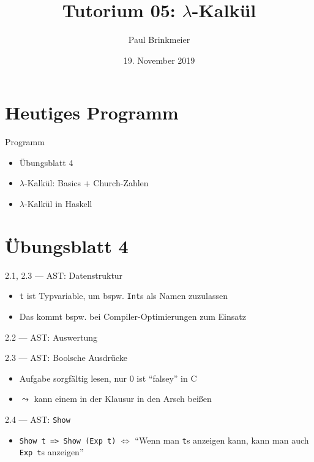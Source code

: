 \documentclass{beamer}
\title{Tutorium 05: $\lambda$-Kalkül}
\author{Paul Brinkmeier}
\institute{Tutorium Programmierparadigmen am KIT}
\date{19. November 2019}
\newcommand{\code}[1]{
	\begin{mdframed}
		
	\end{mdframed}
}
\begin{document}
\begin{frame}
	\titlepage
\end{frame}

\section{Heutiges Programm}
\begin{frame}{Programm}
	\begin{itemize}
		\item Übungsblatt 4
		\item $\lambda$-Kalkül: Basics + Church-Zahlen
		\pause
		\item $\lambda$-Kalkül in Haskell
	\end{itemize}
\end{frame}

\section{Übungsblatt 4}

\begin{frame}{2.1, 2.3 --- AST: Datenstruktur}
	\code{demos/AstType.hs}

	\begin{itemize}
		\item \texttt{t} ist Typvariable, um bspw. \texttt{Int}s als Namen zuzulassen
		\item Das kommt bspw. bei Compiler-Optimierungen zum Einsatz
	\end{itemize}
\end{frame}

\begin{frame}{2.2 --- AST: Auswertung}
	\code{demos/AstEval.hs}
\end{frame}

\begin{frame}{2.3 --- AST: Boolsche Ausdrücke}
	\code{demos/AstEval2.hs}

	\begin{itemize}
		\item Aufgabe sorgfältig lesen, nur 0 ist \enquote{falsey} in C
		\item $\leadsto$ kann einem in der Klausur in den Arsch beißen
	\end{itemize}
\end{frame}

\begin{frame}{2.4 --- AST: \texttt{Show}}
	\code{demos/AstShow.hs}

	\begin{itemize}
		\item \texttt{Show t => Show (Exp t)} $\Leftrightarrow$ \enquote{Wenn man \texttt{t}s anzeigen kann, kann man auch \texttt{Exp t}s anzeigen}
	\end{itemize}
\end{frame}
\end{document}
